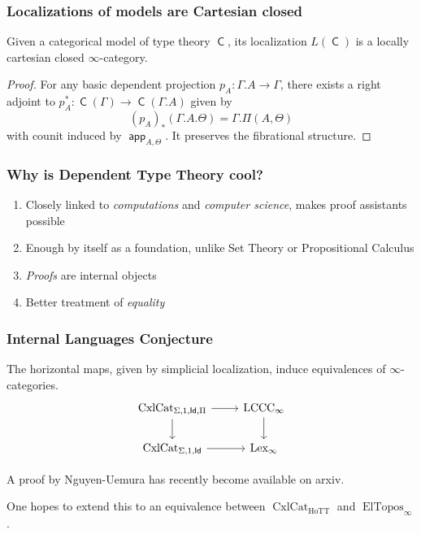 \documentclass{beamer}
\DeclareMathOperator{\Id}{\mathsf{Id}}
\DeclareMathOperator{\sfC}{\mathsf{C}}
\DeclareMathOperator{\cxl}{CxlCat}
\DeclareMathOperator{\HoTT}{HoTT}
\DeclareMathOperator{\ElTopos}{ElTopos}
\DeclareMathOperator{\lexi}{Lex_\infty}
\DeclareMathOperator{\lccci}{LCCC_\infty}
\DeclareMathOperator{\app}{\mathsf{app}}
\begin{document}
\begin{frame}
  \frametitle{Localizations of models are Cartesian closed}

  \begin{thm}[Kapulkin 2015]
    Given a categorical model of type theory $\sfC$, its localization
    $L(\sfC)$ is a locally cartesian closed $\infty$-category.
  \end{thm}
  \pause

  \begin{proof}
    For any basic dependent projection $p_A\colon\Gamma.A\rightarrow\Gamma$,
    there exists a right adjoint to
    $p_A^*\colon\sfC(\Gamma)\rightarrow\sfC(\Gamma.A)$ given by
    \[(p_A)_*(\Gamma.A.\Theta)=\Gamma.\Pi(A,\Theta)\]
    with counit induced by $\app_{A,\Theta}$. It preserves the fibrational
    structure.
  \end{proof}
\end{frame}

\begin{frame}
\end{frame}

\begin{frame}
  \frametitle{Why is Dependent Type Theory cool?}

  \begin{enumerate}
    \item Closely linked to \emph{computations} and \emph{computer science},
      makes proof assistants possible
    \item Enough by itself as a foundation, unlike Set Theory or Propositional
      Calculus
    \item \emph{Proofs} are internal objects
    \item Better treatment of \emph{equality}
  \end{enumerate}
\end{frame}

\begin{frame}
  \frametitle{Internal Languages Conjecture}

  \begin{conj}
    The horizontal maps, given by simplicial localization, induce
    equivalences of $\infty$-categories.
    \[\begin{tikzcd}[ampersand replacement=\&]
      {\cxl_{\Sigma,1,\Id,\Pi}} \& {\lccci} \\
      {\cxl_{\Sigma,1,\Id}} \& {\lexi}
      \arrow[from=1-1, to=2-1]
      \arrow[from=1-2, to=2-2]
      \arrow[from=2-1, to=2-2]
      \arrow[from=1-1, to=1-2]
    \end{tikzcd}\]
  \end{conj}

  A proof by Nguyen-Uemura has recently become available on arxiv.

  One hopes to extend this to an equivalence between $\cxl_{\HoTT}$ and
  $\ElTopos_\infty$.
\end{frame}
\end{document}
